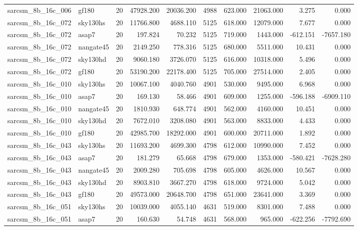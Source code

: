 \begin{tabular}{llrrrrrrrr}
sarcsm\_8b\_16c\_006 & gf180 & 20 & 47928.200 & 20036.200 & 4988 & 623.000 & 21063.000 & 3.275 & 0.000 \\
sarcsm\_8b\_16c\_072 & sky130hs & 20 & 11766.800 & 4688.110 & 5125 & 618.000 & 12079.000 & 7.677 & 0.000 \\
sarcsm\_8b\_16c\_072 & asap7 & 20 & 197.824 & 70.232 & 5125 & 719.000 & 1443.000 & -612.151 & -7657.180 \\
sarcsm\_8b\_16c\_072 & nangate45 & 20 & 2149.250 & 778.316 & 5125 & 680.000 & 5511.000 & 10.431 & 0.000 \\
sarcsm\_8b\_16c\_072 & sky130hd & 20 & 9060.180 & 3726.070 & 5125 & 616.000 & 10318.000 & 5.496 & 0.000 \\
sarcsm\_8b\_16c\_072 & gf180 & 20 & 53190.200 & 22178.400 & 5125 & 705.000 & 27514.000 & 2.405 & 0.000 \\
sarcsm\_8b\_16c\_010 & sky130hs & 20 & 10067.100 & 4040.760 & 4901 & 530.000 & 9495.000 & 6.968 & 0.000 \\
sarcsm\_8b\_16c\_010 & asap7 & 20 & 169.130 & 58.466 & 4901 & 609.000 & 1255.000 & -596.188 & -6909.110 \\
sarcsm\_8b\_16c\_010 & nangate45 & 20 & 1810.930 & 648.774 & 4901 & 562.000 & 4160.000 & 10.451 & 0.000 \\
sarcsm\_8b\_16c\_010 & sky130hd & 20 & 7672.010 & 3208.080 & 4901 & 563.000 & 8833.000 & 4.433 & 0.000 \\
sarcsm\_8b\_16c\_010 & gf180 & 20 & 42985.700 & 18292.000 & 4901 & 600.000 & 20711.000 & 1.892 & 0.000 \\
sarcsm\_8b\_16c\_043 & sky130hs & 20 & 11693.200 & 4699.300 & 4798 & 612.000 & 10990.000 & 7.452 & 0.000 \\
sarcsm\_8b\_16c\_043 & asap7 & 20 & 181.279 & 65.668 & 4798 & 679.000 & 1353.000 & -580.421 & -7628.280 \\
sarcsm\_8b\_16c\_043 & nangate45 & 20 & 2009.280 & 705.698 & 4798 & 605.000 & 4626.000 & 10.567 & 0.000 \\
sarcsm\_8b\_16c\_043 & sky130hd & 20 & 8903.810 & 3667.270 & 4798 & 618.000 & 9724.000 & 5.042 & 0.000 \\
sarcsm\_8b\_16c\_043 & gf180 & 20 & 49573.000 & 20648.700 & 4798 & 651.000 & 23641.000 & 3.369 & 0.000 \\
sarcsm\_8b\_16c\_051 & sky130hs & 20 & 10039.000 & 4055.140 & 4631 & 519.000 & 8301.000 & 7.488 & 0.000 \\
sarcsm\_8b\_16c\_051 & asap7 & 20 & 160.630 & 54.748 & 4631 & 568.000 & 965.000 & -622.256 & -7792.690 \\

\end{tabular}
